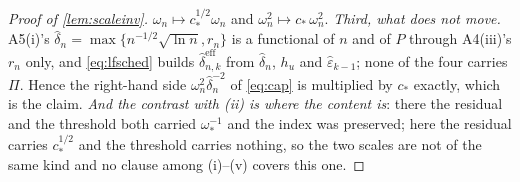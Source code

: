 \begin{proof}[Proof of \cref{lem:scaleinv}]
$\omega_n\mapsto c_\ast^{1/2}\omega_n$
and $\omega_n^{2}\mapsto c_\ast\,\omega_n^{2}$. \emph{Third, what does not move.} A5(i)'s
$\hat\delta_n=\max\{n^{-1/2}\sqrt{\ln n},r_n\}$ is a functional of $n$ and of $P$ through A4(iii)'s $r_n$
only, and \eqref{eq:lfsched} builds $\hat\delta^{\mathrm{eff}}_{n,k}$ from $\hat\delta_n$, $h_u$ and
$\hat\varepsilon_{k-1}$; none of the four carries $\Pi$. Hence the right-hand side
$\omega_n^{2}\hat\delta_n^{-2}$ of \eqref{eq:cap} is multiplied by $c_\ast$ exactly, which is the claim.
\emph{And the contrast with (ii) is where the content is}: there the residual and the threshold both
carried $\omega_\ast^{-1}$ and the index was preserved; here the residual carries $c_\ast^{1/2}$ and the
threshold carries nothing, so the two scales are not of the same kind and no clause among
\textup{(i)}--\textup{(v)} covers this one.
\end{proof}

